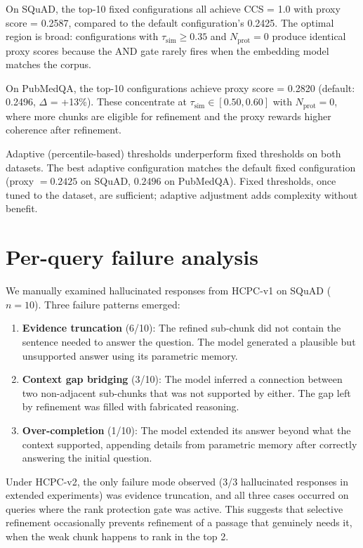 On SQuAD, the top-10 fixed configurations all achieve CCS = 1.0
with proxy score = 0.2587, compared to the default configuration's
0.2425. The optimal region is broad: configurations with
$\tau_\text{sim} \geq 0.35$ and $N_\text{prot} = 0$ produce
identical proxy scores because the AND gate rarely fires when
the embedding model matches the corpus.

On PubMedQA, the top-10 configurations achieve proxy score = 0.2820
(default: 0.2496, $\Delta$ = +13\%). These concentrate at
$\tau_\text{sim} \in [0.50, 0.60]$ with $N_\text{prot} = 0$, where
more chunks are eligible for refinement and the proxy rewards higher
coherence after refinement.

Adaptive (percentile-based) thresholds underperform fixed thresholds on
both datasets. The best adaptive configuration matches the default fixed
configuration (proxy $= 0.2425$ on SQuAD, $0.2496$ on PubMedQA). Fixed
thresholds, once tuned to the dataset, are sufficient; adaptive
adjustment adds complexity without benefit.

\FloatBarrier
\section{Per-query failure analysis}
\label{app:failure}

We manually examined hallucinated responses from HCPC-v1 on SQuAD
($n = 10$). Three failure patterns emerged:

\begin{enumerate}
  \item \textbf{Evidence truncation} (6/10): The refined sub-chunk did
        not contain the sentence needed to answer the question. The
        model generated a plausible but unsupported answer using its
        parametric memory.

  \item \textbf{Context gap bridging} (3/10): The model inferred a
        connection between two non-adjacent sub-chunks that was not
        supported by either. The gap left by refinement was filled
        with fabricated reasoning.

  \item \textbf{Over-completion} (1/10): The model extended its answer
        beyond what the context supported, appending details from
        parametric memory after correctly answering the initial question.
\end{enumerate}

Under HCPC-v2, the only failure mode observed (3/3 hallucinated responses
in extended experiments) was evidence truncation, and all three cases
occurred on queries where the rank protection gate was active. This
suggests that selective refinement occasionally prevents refinement of
a passage that genuinely needs it, when the weak chunk happens to rank in
the top 2.

